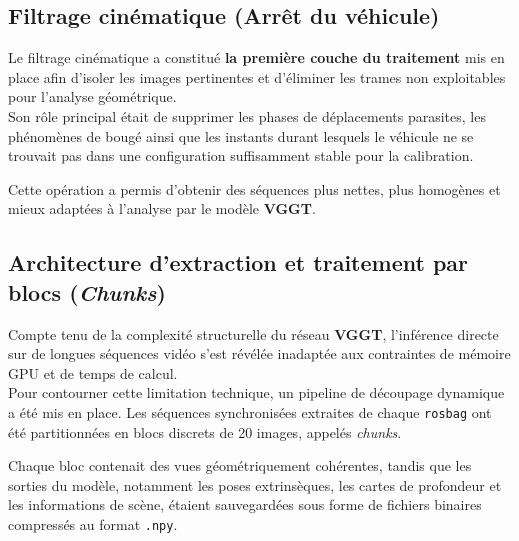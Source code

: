 \documentclass[12pt,a4paper,oneside]{report}
\begin{document}
\vspace{2cm}

\subsection{Filtrage cinématique (Arrêt du véhicule)}

\vspace{1cm}

\hspace*{1cm}Le filtrage cinématique a constitué \textbf{la première couche du traitement} mis en place afin d'isoler les images pertinentes et d'éliminer les trames non exploitables pour l'analyse géométrique.\\

\hspace*{1cm}Son rôle principal était de supprimer les phases de déplacements parasites, les phénomènes de bougé ainsi que les instants durant lesquels le véhicule ne se trouvait pas dans une configuration suffisamment stable pour la calibration.\vspace{0.05cm}

\hspace*{1cm}Cette opération a permis d'obtenir des séquences plus nettes, plus homogènes et mieux adaptées à l'analyse par le modèle \textbf{VGGT}.

\newpage

\subsection{Architecture d'extraction et traitement par blocs (\textit{Chunks})}

\hspace*{1cm}Compte tenu de la complexité structurelle du réseau \textbf{VGGT}, l'inférence directe sur de longues séquences vidéo s'est révélée inadaptée aux contraintes de mémoire GPU et de temps de calcul.\\

\hspace*{1cm}Pour contourner cette limitation technique, un pipeline de découpage dynamique a été mis en place. Les séquences synchronisées extraites de chaque \texttt{rosbag} ont été partitionnées en blocs discrets de 20 images, appelés \textit{chunks}.\vspace{0.05cm}

\hspace*{1cm}Chaque bloc contenait des vues géométriquement cohérentes, tandis que les sorties du modèle, notamment les poses extrinsèques, les cartes de profondeur et les informations de scène, étaient sauvegardées sous forme de fichiers binaires compressés au format \texttt{.npy}.\\
\end{document}
